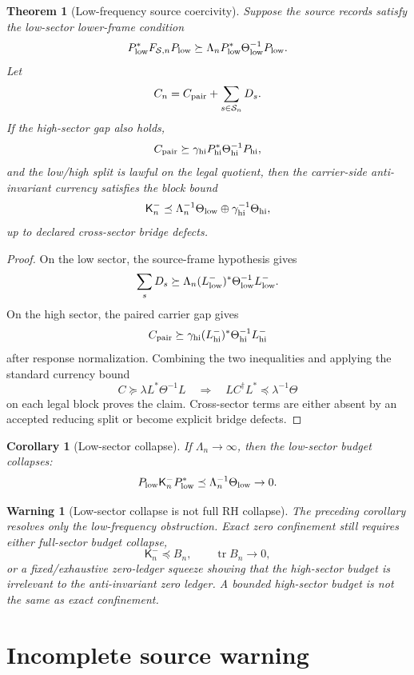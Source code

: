 \documentclass[11pt]{article}
\newtheorem{theorem}{Theorem}
\newtheorem{warning}{Warning}
\newtheorem{corollary}{Corollary}
\newcommand{\K}{\mathsf K}
\newcommand{\tr}{\operatorname{tr}}
\begin{document}
\begin{theorem}[Low-frequency source coercivity]
Suppose the source records satisfy the low-sector lower-frame condition
\[
P_{\rm low}^*F_{\mathcal S,n}P_{\rm low}
\succeq
\Lambda_n P_{\rm low}^*\Theta_{\rm low}^{-1}P_{\rm low}.
\]
Let
\[
C_n=C_{\rm pair}+\sum_{s\in\mathcal S_n}D_s.
\]
If the high-sector gap also holds,
\[
C_{\rm pair}\succeq \gamma_{\rm hi} P_{\rm hi}^*\Theta_{\rm hi}^{-1}P_{\rm hi},
\]
and the low/high split is lawful on the legal quotient, then the carrier-side anti-invariant currency satisfies the block bound
\[
\K_n^-
\preceq
\Lambda_n^{-1}\Theta_{\rm low}
\oplus
\gamma_{\rm hi}^{-1}\Theta_{\rm hi},
\]
up to declared cross-sector bridge defects.
\end{theorem}

\begin{proof}
On the low sector, the source-frame hypothesis gives
\[
\sum_s D_s\succeq \Lambda_n (L^-_{\rm low})^*\Theta_{\rm low}^{-1}L^-_{\rm low}.
\]
On the high sector, the paired carrier gap gives
\[
C_{\rm pair}\succeq \gamma_{\rm hi}(L^-_{\rm hi})^*\Theta_{\rm hi}^{-1}L^-_{\rm hi}
\]
after response normalization. Combining the two inequalities and applying the standard currency bound
\[
C\succeq \lambda L^*\Theta^{-1}L
\quad\Longrightarrow\quad
LC^\dagger L^*\preceq \lambda^{-1}\Theta
\]
on each legal block proves the claim. Cross-sector terms are either absent by an accepted reducing split or become explicit bridge defects.\end{proof}

\begin{corollary}[Low-sector collapse]
If $\Lambda_n\to\infty$, then the low-sector budget collapses:
\[
P_{\rm low}\K_n^-P_{\rm low}^*\preceq \Lambda_n^{-1}\Theta_{\rm low}\to0.
\]
\end{corollary}

\begin{warning}[Low-sector collapse is not full RH collapse]
The preceding corollary resolves only the low-frequency obstruction. Exact zero confinement still requires either full-sector budget collapse,
\[
\K_n^-\preceq B_n,
\qquad \tr B_n\to0,
\]
or a fixed/exhaustive zero-ledger squeeze showing that the high-sector budget is irrelevant to the anti-invariant zero ledger. A bounded high-sector budget is not the same as exact confinement.
\end{warning}

\section{Incomplete source warning}
\end{document}
